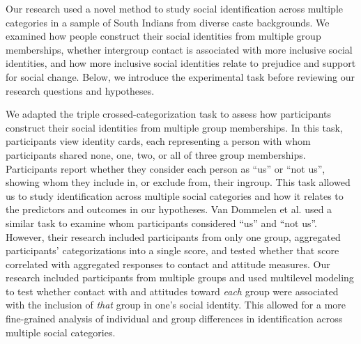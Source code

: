 \documentclass[12pt, a4paper]{article}
\begin{document}
Our research used a novel method to study social identification across multiple categories in a sample of South Indians from diverse caste backgrounds. We examined how people construct their social identities from multiple group memberships, whether intergroup contact is associated with more inclusive social identities, and how more inclusive social identities relate to prejudice and support for social change. Below, we introduce the experimental task before reviewing our research questions and hypotheses.

We adapted the triple crossed-categorization task \parencite{van_dommelen_construing_2015} to assess how participants construct their social identities from multiple group memberships. In this task, participants view identity cards, each representing a person with whom participants shared none, one, two, or all of three group memberships. Participants report whether they consider each person as “us” or “not us”, showing whom they include in, or exclude from, their ingroup. This task allowed us to study identification across multiple social categories and how it relates to the predictors and outcomes in our hypotheses. Van Dommelen et al. \citeyear{van_dommelen_construing_2015} used a similar task to examine whom participants considered “us” and “not us”. However, their research included participants from only one group, aggregated participants’ categorizations into a single score, and tested whether that score correlated with aggregated responses to contact and attitude measures. Our research included participants from multiple groups and used multilevel modeling to test whether contact with and attitudes toward \emph{each} group were associated with the inclusion of \emph{that} group in one’s social identity. This allowed for a more fine-grained analysis of individual and group differences in identification across multiple social categories.
\end{document}
